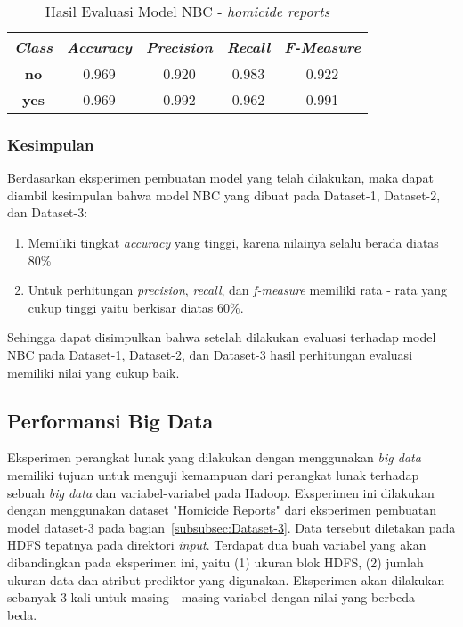 \begin{table}[H]
\label{tab:model evaluation - homicide}
\centering
\caption{Hasil Evaluasi Model NBC - \textit{homicide reports}}
\begin{tabular}{ | c | c | c | c | c | }
\hline
\textit{\textbf{Class}} & \textit{\textbf{Accuracy}} & \textit{\textbf{Precision}} & \textit{\textbf{Recall}} & \textit{\textbf{F-Measure}}\\ \hline \hline
\textbf{no} & 0.969 & 0.920 & 0.983 & 0.922 \\ \hline
\textbf{yes} & 0.969 & 0.992 & 0.962 & 0.991 \\ \hline
\end{tabular}
\end{table}

\subsubsection{Kesimpulan}
Berdasarkan eksperimen pembuatan model yang telah dilakukan, maka dapat diambil kesimpulan bahwa model NBC yang dibuat pada Dataset-1, Dataset-2, dan Dataset-3:

\begin{enumerate}[label=(\alph*)]
	\item Memiliki tingkat \textit{accuracy} yang tinggi, karena nilainya selalu berada diatas 80\%
	\item Untuk perhitungan \textit{precision}, \textit{recall}, dan \textit{f-measure} memiliki rata - rata yang cukup tinggi yaitu berkisar diatas 60\%.
\end{enumerate}

Sehingga dapat disimpulkan bahwa setelah dilakukan evaluasi terhadap model NBC pada Dataset-1, Dataset-2, dan Dataset-3 hasil perhitungan evaluasi memiliki nilai yang cukup baik. 



\subsection{Performansi Big Data}
Eksperimen perangkat lunak yang dilakukan dengan menggunakan \textit{big data} memiliki tujuan untuk menguji kemampuan dari perangkat lunak terhadap sebuah \textit{big data} dan variabel-variabel pada Hadoop. Eksperimen ini dilakukan dengan menggunakan dataset "Homicide Reports" dari eksperimen pembuatan model dataset-3 pada bagian~\ref{subsubsec:Dataset-3}. Data tersebut diletakan pada HDFS tepatnya pada direktori \textit{input}. Terdapat dua buah variabel yang akan dibandingkan pada eksperimen ini, yaitu (1) ukuran blok HDFS, (2) jumlah ukuran data dan atribut prediktor yang digunakan. Eksperimen akan dilakukan sebanyak 3 kali untuk masing - masing variabel dengan nilai yang berbeda - beda.

